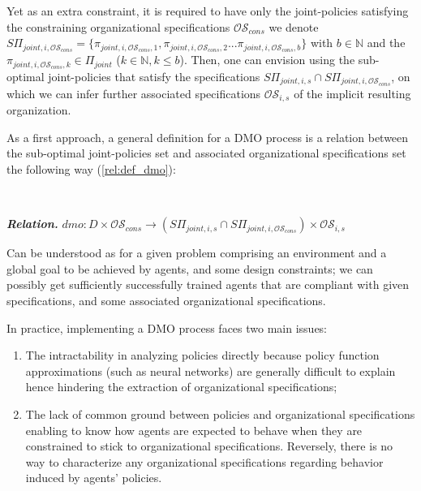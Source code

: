 \documentclass[doubleblind]{ecai}
\newcounter{relation}
\renewcommand{\therelation}{\arabic{relation}}
\newenvironment{relation}[1][]{%
    \refstepcounter{relation}%
    \noindent \raggedright \textit{\textbf{Relation. \therelation}} \hfill$}
{%
$ \hfill \phantom{x}

}
\begin{document}
Yet as an extra constraint, it is required to have only the joint-policies satisfying the constraining organizational specifications $\mathcal{OS}_{cons}$ we denote $S\Pi_{joint,i,\mathcal{OS}_{cons}} = \{\pi_{joint,i,\mathcal{OS}_{cons},1}, \pi_{joint,i,\mathcal{OS}_{cons},2} ... \pi_{joint,i,\mathcal{OS}_{cons},b}\}$ with $b \in \mathbb{N}$ and the $\pi_{joint,i,\mathcal{OS}_{cons},k} \in \Pi_{joint}$ ($k \in \mathbb{N}, k \leq b$). Then, one can envision using the sub-optimal joint-policies that satisfy the specifications $S\Pi_{joint,i,s} \cap S\Pi_{joint,i,\mathcal{OS}_{cons}}$, on which we can infer further associated specifications $\mathcal{OS}_{i,s}$ of the implicit resulting organization.

As a first approach, a general definition for a DMO process is a relation between the sub-optimal joint-policies set and associated organizational specifications set the following way (\autoref{rel:def_dmo}):

\

\begin{relation}\label{rel:def_dmo}
    dmo: D \times \mathcal{OS}_{cons} \rightarrow (S\Pi_{joint,i,s} \cap S\Pi_{joint,i,\mathcal{OS}_{cons}}) \times \mathcal{OS}_{i,s}
\end{relation}
Can be understood as for a given problem comprising an environment and a global goal to be achieved by agents, and some design constraints; we can possibly get sufficiently successfully trained agents that are compliant with given specifications, and some associated organizational specifications.

In practice, implementing a DMO process faces two main issues:
%
\begin{enumerate}
    \item The intractability in analyzing policies directly because policy function approximations (such as neural networks) are generally difficult to explain hence hindering the extraction of organizational specifications;
    \item The lack of common ground between policies and organizational specifications enabling to know how agents are expected to behave when they are constrained to stick to organizational specifications. Reversely, there is no way to characterize any organizational specifications regarding behavior induced by agents' policies.
\end{enumerate}
\end{document}
